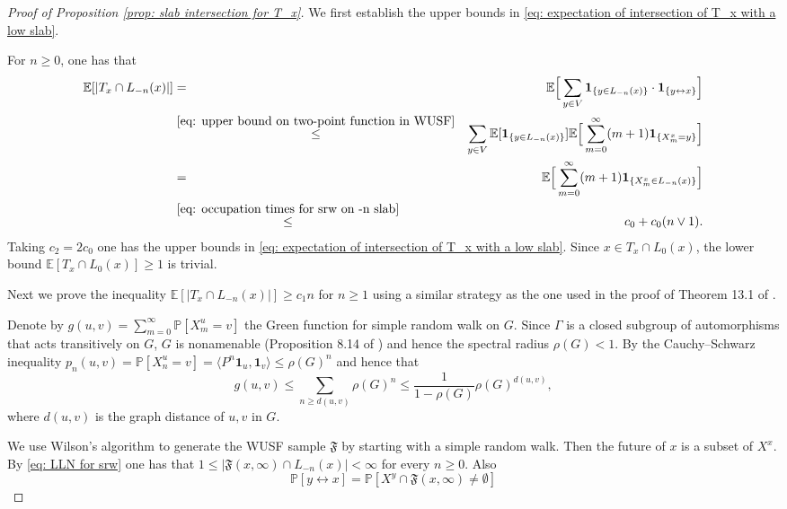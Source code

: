\documentclass[12pt]{article}
\numberwithin{equation}{section}
\newcommand{\1}{\mathbf{1}}
\begin{document}
 \begin{proof}[Proof of Proposition \ref{prop: slab intersection for T_x}]
 We first establish the upper bounds in \eqref{eq: expectation of intersection of T_x with a low slab}. 
 
 For $n\geq 0$, one has that 
 \begin{eqnarray}
 \mathbb{E}[|T_x\cap L_{-n}(x)|]
 &=&\mathbb{E}\Big[\sum_{y\in V}{\mathbf{1}_{\{y\in L_{-n}(x) \}}\cdot \mathbf{1}_{ \{y\leftrightarrow x \} } }\Big]\nonumber\\
 &\stackrel{\eqref{eq: upper bound on two-point function in WUSF} }{\leq}&
 \sum_{y\in V}\mathbb{E}[\mathbf{1}_{\{y\in L_{-n}(x) \}}]\mathbb{E}\Big[\sum_{m=0}^{\infty} (m+1)\mathbf{1}_{\{ X_m^x=y \}}\Big]\nonumber\\
 &= &\mathbb{E}\Big[\sum_{m=0}^{\infty} (m+1)\mathbf{1}_{\{ X_m^x\in L_{-n}(x) \}}\Big]\nonumber\\
 &\stackrel{\eqref{eq: occupation times for srw on -n slab}}{\leq }&c_0+c_0(n\vee 1).
 \end{eqnarray}
 Taking $c_{2}=2c_0$ one has the upper bounds in \eqref{eq: expectation of intersection of T_x with a low slab}. Since $x\in T_x\cap L_{0}(x)$, the lower bound $\mathbb{E}[T_x\cap L_0(x)]\geq 1$ is trivial. 
 
 
 Next we prove the inequality $\mathbb{E}[|T_x\cap L_{-n}(x)|]\geq c_1n$ for $n\geq1$ using a similar strategy as the one used in the proof of Theorem 13.1 of \cite{BLPS2001}. 
 
 Denote by $g(u,v)=\sum_{m=0}^{\infty}\mathbb{P}[X_m^u=v]$
 the Green function for simple random walk on $G$. Since $\Gamma$ is a closed subgroup of automorphisms that acts transitively on $G$, $G$ is nonamenable (Proposition 8.14 of \cite{LP2016}) and hence the spectral radius
 $\rho(G)<1$.  By the Cauchy--Schwarz inequality $p_n(u,v)=\mathbb{P}[X_n^u=v]=\langle P^n \mathbf{1}_u,\mathbf{1}_v\rangle\leq \rho(G)^n$ and hence that 
 \[
 g(u,v)\leq \sum_{n\geq d(u,v)}\rho(G)^n\leq \frac{1}{1-\rho(G)}\rho(G)^{d(u,v)},
 \]
 where $d(u,v)$ is the graph distance of $u,v$ in $G$. 
 
 We use Wilson's algorithm to generate the WUSF sample $\mathfrak{F}$ by starting with a simple random walk. Then the future of $x$ is a subset of $X^x$. By \eqref{eq: LLN for srw} one has that $1\leq |\mathfrak{F}(x,\infty)\cap L_{-n}(x)|<\infty$  for every $n\geq0$. Also
 \[
 \mathbb{P}[y\leftrightarrow x]=\mathbb{P}[X^y \cap \mathfrak{F}(x,\infty)\neq\emptyset]
 \]
 
 
 

\end{proof}
\end{document}
